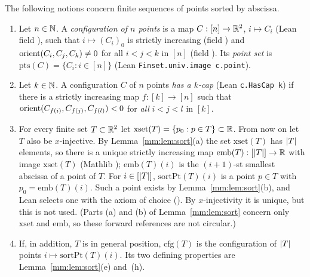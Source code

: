 \begin{definition}\label{mm:def:config}
The following notions concern finite sequences of points sorted by abscissa.
\begin{enumerate}[label=(\alph*)]
\item Let $n\in\mathbb N$. A \emph{configuration of $n$ points} is a map $C:[n]\to\mathbb R^2$, $i\mapsto C_i$ (Lean
  field ), such that $i\mapsto(C_i)_0$ is strictly increasing (field ) and
  $\operatorname{orient}(C_i,C_j,C_k)\ne0$ for all $i<j<k$ in $[n]$ (field ). Its \emph{point
  set} is $\mathrm{pts}(C)=\{C_i:i\in[n]\}$ (Lean \texttt{Finset.univ.image c.point}).
\item Let $k\in\mathbb N$. A configuration $C$ of $n$ points \emph{has a $k$-cap} (Lean \texttt{c.HasCap k}) if
  there is a strictly increasing map $f:[k]\to[n]$ such that $\operatorname{orient}(C_{f(i)},C_{f(j)},C_{f(l)})<0$ for
  \emph{all} $i<j<l$ in $[k]$.
\item For every finite set $T\subset\mathbb R^2$ let $\mathrm{xset}(T)=\{p_0:p\in T\}\subset\mathbb R$. From now on
  let $T$ also be $x$-injective. By Lemma~\ref{mm:lem:sort}(a) the set $\mathrm{xset}(T)$ has $\lvert T\rvert$
  elements, so there is a unique strictly increasing map $\mathrm{emb}(T):[\lvert T\rvert]\to\mathbb R$ with image
  $\mathrm{xset}(T)$ (Mathlib ); $\mathrm{emb}(T)(i)$ is the $(i+1)$-st
  smallest abscissa of a point of $T$. For $i\in[\lvert T\rvert]$, $\mathrm{sortPt}(T)(i)$ is a point $p\in T$
  with $p_0=\mathrm{emb}(T)(i)$. Such a point exists by Lemma~\ref{mm:lem:sort}(b), and Lean selects one
  with the axiom of choice (). By $x$-injectivity it is unique, but this is not
  used. (Parts (a) and (b) of Lemma~\ref{mm:lem:sort} concern only $\mathrm{xset}$ and $\mathrm{emb}$,
  so these forward references are not circular.)
\item If, in addition, $T$ is in general position, $\mathrm{cfg}(T)$ is the configuration of $\lvert T\rvert$ points
  $i\mapsto\mathrm{sortPt}(T)(i)$. Its two defining properties are Lemma~\ref{mm:lem:sort}(e) and~(h).
\end{enumerate}
\end{definition}

